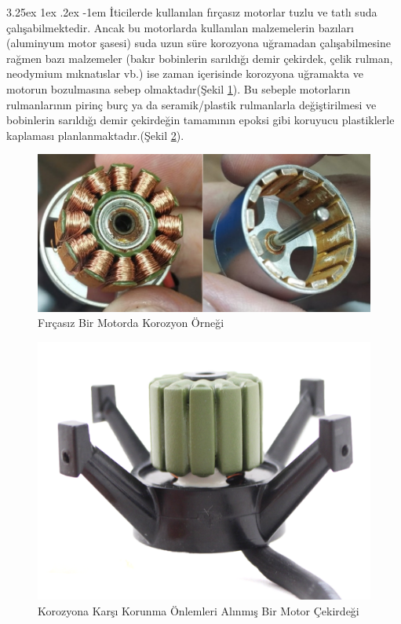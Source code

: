 \documentclass[12pt]{article}
\makeatletter
\renewcommand\paragraph{\@startsection{paragraph}{5}{\z@}%
  {3.25ex \@plus1ex \@minus.2ex}%
  {-1em}%
  {\normalfont\normalsize\bfseries}}
\makeatother
\begin{document}
\paragraph{} İticilerde kullanılan fırçasız motorlar tuzlu ve tatlı suda çalışabilmektedir. Ancak bu motorlarda kullanılan malzemelerin bazıları (aluminyum motor şasesi) suda uzun süre korozyona uğramadan çalışabilmesine rağmen bazı malzemeler (bakır bobinlerin sarıldığı demir çekirdek, çelik rulman, neodymium mıknatıslar vb.) ise zaman içerisinde korozyona uğramakta ve motorun bozulmasına sebep olmaktadır(Şekil \ref{fig:korozyon}). Bu sebeple motorların rulmanlarının pirinç burç ya da seramik/plastik rulmanlarla değiştirilmesi ve bobinlerin sarıldığı demir çekirdeğin tamamının epoksi gibi koruyucu plastiklerle kaplaması planlanmaktadır.(Şekil \ref{fig:potted}). 

\begin{figure}[hbt!]
\centering
 \begin{adjustbox}{width=7cm}
\includegraphics[width=1\textwidth]{images/korozyon.png}
 \end{adjustbox}
\caption{Fırçasız Bir Motorda Korozyon Örneği}
\label{fig:korozyon}
\end{figure}

\begin{figure}[hbt!]
\centering
 \begin{adjustbox}{width=7cm}
\includegraphics[width=1\textwidth]{images/potted.png}
 \end{adjustbox}
\caption{Korozyona Karşı Korunma Önlemleri Alınmış Bir Motor Çekirdeği}
\label{fig:potted}
\end{figure}
\end{document}
